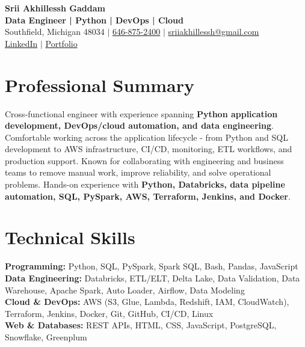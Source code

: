 \documentclass[letterpaper,10pt]{article}
\begin{document}
\fontsize{9.35pt}{10.45pt}\selectfont

\begin{center}
    {\LARGE \textbf{Srii Akhillessh Gaddam}} \\[-1pt]
    \textbf{Data Engineer | Python | DevOps | Cloud} \\[2pt]
    Southfield, Michigan 48034 $|$
    \href{tel:6468752400}{646-875-2400} $|$
    \href{mailto:sriiakhillessh@gmail.com}{sriiakhillessh@gmail.com} \\[1pt]
    \href{https://www.linkedin.com/in/srii-akhiilessh-gaddam-b48668191/}{LinkedIn} $|$
    \href{https://sriiakhillesshg.github.io/portfolio/}{Portfolio}
\end{center}
\vspace{-8pt}

\section{Professional Summary}
\small{Cross-functional engineer with experience spanning \textbf{Python application development, DevOps/cloud automation, and data engineering}. Comfortable working across the application lifecycle - from Python and SQL development to AWS infrastructure, CI/CD, monitoring, ETL workflows, and production support. Known for collaborating with engineering and business teams to remove manual work, improve reliability, and solve operational problems. Hands-on experience with \textbf{Python, Databricks, data pipeline automation, SQL, PySpark, AWS, Terraform, Jenkins, and Docker}.}

\section{Technical Skills}
\small{
\textbf{Programming:} Python, SQL, PySpark, Spark SQL, Bash, Pandas, JavaScript \\
\textbf{Data Engineering:} Databricks, ETL/ELT, Delta Lake, Data Validation, Data Warehouse, Apache Spark, Auto Loader, Airflow, Data Modeling \\
\textbf{Cloud \& DevOps:} AWS (S3, Glue, Lambda, Redshift, IAM, CloudWatch), Terraform, Jenkins, Docker, Git, GitHub, CI/CD, Linux \\
\textbf{Web \& Databases:} REST APIs, HTML, CSS, JavaScript, PostgreSQL, Snowflake, Greenplum
}
\end{document}
